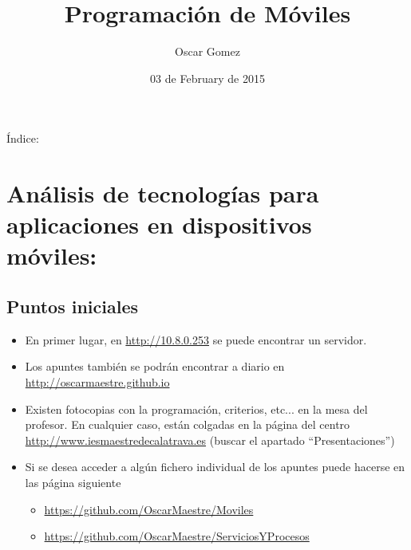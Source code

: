 \documentclass[a4paper,12pt,spanish]{sphinxmanual}
\title{Programación de Móviles}
\date{03 de February de 2015}
\author{Oscar Gomez}
\begin{document}
\maketitle
\tableofcontents
{}\label{index::doc}


Índice:


\chapter{Análisis de tecnologías para aplicaciones en dispositivos móviles:}
\label{tema1:analisis-de-tecnologias-para-aplicaciones-en-dispositivos-moviles}\label{tema1:prog-multimedia-y-de-dispositivos-moviles}\label{tema1::doc}

\section{Puntos iniciales}
\label{tema1:puntos-iniciales}\begin{itemize}
\item {} 
En primer lugar, en \href{http://10.8.0.253}{http://10.8.0.253} se puede encontrar un servidor.

\item {} 
Los apuntes también se podrán encontrar a diario en \href{http://oscarmaestre.github.io}{http://oscarmaestre.github.io}

\item {} 
Existen fotocopias con la programación, criterios, etc... en la mesa del profesor. En cualquier caso, están colgadas en la página del centro \href{http://www.iesmaestredecalatrava.es}{http://www.iesmaestredecalatrava.es} (buscar el apartado ``Presentaciones'')

\item {} 
Si se desea acceder a algún fichero individual de los apuntes puede hacerse en las página siguiente
\begin{itemize}
\item {} 
\href{https://github.com/OscarMaestre/Moviles}{https://github.com/OscarMaestre/Moviles}

\item {} 
\href{https://github.com/OscarMaestre/ServiciosYProcesos}{https://github.com/OscarMaestre/ServiciosYProcesos}

\end{itemize}

\end{itemize}
\end{document}
